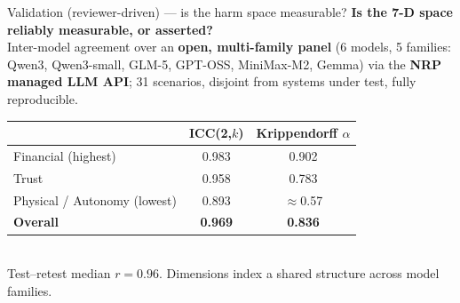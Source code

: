 \documentclass[aspectratio=169,11pt]{beamer}
\newcommand{\hi}[1]{\textcolor{cbblue}{\textbf{#1}}}
\newcommand{\gold}[1]{\textcolor{cborange}{\textbf{#1}}}
\begin{document}
\begin{frame}{Validation (reviewer-driven) --- is the harm space measurable?}
\textbf{Is the 7-D space reliably measurable, or asserted?}\\[2pt]
Inter-model agreement over an \hi{open, multi-family panel} (6 models, 5 families: Qwen3, Qwen3-small, GLM-5, GPT-OSS, MiniMax-M2, Gemma) via the \hi{NRP managed LLM API}; 31 scenarios, disjoint from systems under test, fully reproducible.
\vfill
\centering\small
\begin{tabular}{@{}lcc@{}}
\toprule
& \textbf{ICC(2,$k$)} & \textbf{Krippendorff $\alpha$}\\
\midrule
Financial (highest) & 0.983 & 0.902\\
Trust & 0.958 & 0.783\\
Physical / Autonomy (lowest) & 0.893 & $\approx$0.57\\
\textbf{Overall} & \gold{0.969} & \gold{0.836}\\
\bottomrule
\end{tabular}\\[3pt]
{\scriptsize Test--retest median $r=0.96$. Dimensions index a shared structure across model families.}
\end{frame}
\end{document}
